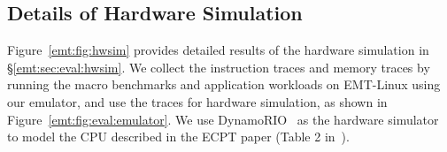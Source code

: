\subsection{Details of Hardware Simulation}
\label{emt:sec:details_hwsim}

\noindent
Figure~\ref{emt:fig:hwsim} provides detailed results 
    of the hardware simulation 
    in \S\ref{emt:sec:eval:hwsim}.
We collect the instruction traces and memory traces by running the macro benchmarks
    and application workloads on EMT-Linux using our emulator,
    and use the traces for hardware simulation, as shown in Figure~\ref{emt:fig:eval:emulator}.
We use DynamoRIO~\cite{plat:dynamorio} as the hardware simulator
    to model the CPU described in the ECPT paper (Table 2 in~\cite{skarlatos2020ecpt}).

	
